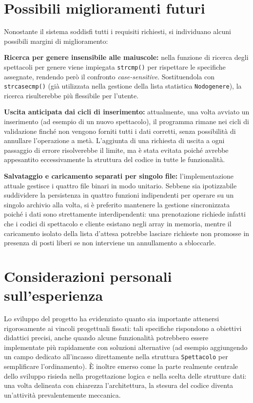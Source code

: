 \documentclass[11pt,a4paper,oneside,openany]{book}
\newenvironment{listacomp}{%
    \small
    \begin{list}{\textendash}{%
        \setlength{\topsep}{2pt}%
        \setlength{\partopsep}{0pt}%
        \setlength{\itemsep}{1pt}%
        \setlength{\parsep}{0pt}%
        \setlength{\leftmargin}{1.2em}%
    }%
}{%
    \end{list}%
}
\begin{document}
\section{Possibili miglioramenti futuri}
Nonostante il sistema soddisfi tutti i requisiti richiesti, si individuano alcuni possibili margini di miglioramento:
\begin{listacomp}
    \item \textbf{Ricerca per genere insensibile alle maiuscole:} nella funzione di ricerca degli spettacoli per genere viene impiegata \texttt{strcmp()} per rispettare le specifiche assegnate, rendendo però il confronto \emph{case-sensitive}. Sostituendola con \texttt{strcasecmp()} (già utilizzata nella gestione della lista statistica \texttt{Nodogenere}), la ricerca risulterebbe più flessibile per l'utente.
    \item \textbf{Uscita anticipata dai cicli di inserimento:} attualmente, una volta avviato un inserimento (ad esempio di un nuovo spettacolo), il programma rimane nei cicli di validazione finché non vengono forniti tutti i dati corretti, senza possibilità di annullare l'operazione a metà. L'aggiunta di una richiesta di uscita a ogni passaggio di errore risolverebbe il limite, ma è stata evitata poiché avrebbe appesantito eccessivamente la struttura del codice in tutte le funzionalità.
    \item \textbf{Salvataggio e caricamento separati per singolo file:} l'implementazione attuale gestisce i quattro file binari in modo unitario. Sebbene sia ipotizzabile suddividere la persistenza in quattro funzioni indipendenti per operare su un singolo archivio alla volta, si è preferito mantenere la gestione sincronizzata poiché i dati sono strettamente interdipendenti: una prenotazione richiede infatti che i codici di spettacolo e cliente esistano negli array in memoria, mentre il caricamento isolato della lista d'attesa potrebbe lasciare richieste non promosse in presenza di posti liberi se non interviene un annullamento a sbloccarle.
\end{listacomp}

\section{Considerazioni personali sull'esperienza}
Lo sviluppo del progetto ha evidenziato quanto sia importante attenersi rigorosamente ai vincoli progettuali fissati: tali specifiche rispondono a obiettivi didattici precisi, anche quando alcune funzionalità potrebbero essere implementate più rapidamente con soluzioni alternative (ad esempio aggiungendo un campo dedicato all'incasso direttamente nella struttura \texttt{Spettacolo} per semplificare l'ordinamento). È inoltre emerso come la parte realmente centrale dello sviluppo risieda nella progettazione logica e nella scelta delle strutture dati: una volta delineata con chiarezza l'architettura, la stesura del codice diventa un'attività prevalentemente meccanica.
\end{document}
